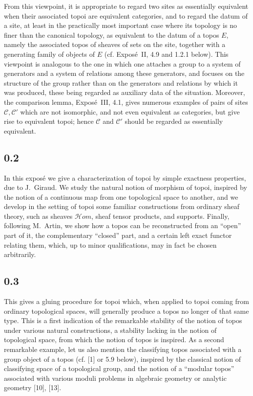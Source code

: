 \documentclass[11pt]{article}
\newcommand{\C}{\mathcal{C}}
\begin{document}
From this viewpoint, it is appropriate to regard two sites as essentially equivalent when their associated topoi are equivalent categories, and to regard the datum of a site, at least in the practically most important case where its topology is no finer than the canonical topology, as equivalent to the datum of a topos \(E\), namely the associated topos of sheaves of sets on the site, together with a generating family of objects of \(E\) (cf. Expos\'e~II, 4.9 and 1.2.1 below). This viewpoint is analogous to the one in which one attaches a group to a system of generators and a system of relations among these generators, and focuses on the structure of the group rather than on the generators and relations by which it was produced, these being regarded as auxiliary data of the situation. Moreover, the comparison lemma, Expos\'e~III, 4.1, gives numerous examples of pairs of sites \(\C,\C'\) which are not isomorphic, and not even equivalent as categories, but give rise to equivalent topoi; hence \(\C\) and \(\C'\) should be regarded as essentially equivalent.

\subsection*{0.2}
In this expos\'e we give a characterization of topoi by simple exactness properties, due to J.~Giraud. We study the natural notion of morphism of topoi, inspired by the notion of a continuous map from one topological space to another, and we develop in the setting of topoi some familiar constructions from ordinary sheaf theory, such as sheaves \(\mathcal Hom\), sheaf tensor products, and supports. Finally, following M.~Artin, we show how a topos can be reconstructed from an ``open'' part of it, the complementary ``closed'' part, and a certain left exact functor relating them, which, up to minor qualifications, may in fact be chosen arbitrarily.

\subsection*{0.3}
This gives a gluing procedure for topoi which, when applied to topoi coming from ordinary topological spaces, will generally produce a topos no longer of that same type. This is a first indication of the remarkable stability of the notion of topos under various natural constructions, a stability lacking in the notion of topological space, from which the notion of topos is inspired. As a second remarkable example, let us also mention the classifying topos associated with a group object of a topos (cf. [1] or 5.9 below), inspired by the classical notion of classifying space of a topological group, and the notion of a ``modular topos'' associated with various moduli problems in algebraic geometry or analytic geometry [10], [13].
\end{document}
